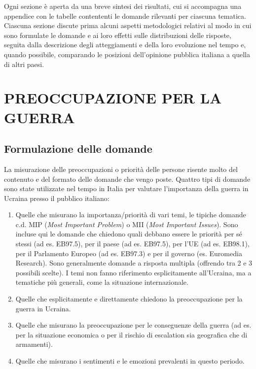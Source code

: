 \documentclass[
  openany]{book}
\begin{document}
Ogni sezione è aperta da una breve sintesi dei risultati, cui si accompagna una appendice con le tabelle contententi le domande rilevanti per ciascuna tematica. Ciascuna sezione discute prima alcuni aspetti metodologici relativi al modo in cui sono formulate le domande e ai loro effetti sulle distribuzioni delle risposte, seguita dalla descrizione degli atteggiamenti e della loro evoluzione nel tempo e, quando possibile, comparando le posizioni dell'opinione pubblica italiana a quella di altri paesi.

\hypertarget{preoccupazione-per-la-guerra}{%
\chapter{PREOCCUPAZIONE PER LA GUERRA}\label{preoccupazione-per-la-guerra}}

\hypertarget{formulazione-delle-domande}{%
\section{Formulazione delle domande}\label{formulazione-delle-domande}}

La misurazione delle preoccupazioni o priorità delle persone risente molto del contenuto e del formato delle domande che vengo poste. Quattro tipi di domande sono state utilizzate nel tempo in Italia per valutare l'importanza della guerra in Ucraina presso il pubblico italiano:

\begin{enumerate}
\def\labelenumi{\alph{enumi})}
\item
  Quelle che misurano la importanza/priorità di vari temi, le tipiche domande c.d. MIP (\emph{Most Important Problem}) o MII (\emph{Most Important Issues}). Sono incluse qui le domande che chiedono quali debbano essere le priorità per sé stessi (ad es. EB97.5), per il paese (ad es. EB97.5), per l'UE (ad es. EB98.1), per il Parlamento Europeo (ad es. EB97.3) e per il governo (es. Euromedia Research). Sono generalmente domande a risposta multipla (offrendo tra 2 e 3 possibili scelte). I temi non fanno riferimento esplicitamente all'Ucraina, ma a tematiche più generali, come la situazione internazionale.
\item
  Quelle che esplicitamente e direttamente chiedono la preoccupazione per la guerra in Ucraina.
\item
  Quelle che misurano la preoccupazione per le conseguenze della guerra (ad es. per la situazione economica o per il rischio di escalation sia geografica che di armamenti).
\item
  Quelle che misurano i sentimenti e le emozioni prevalenti in questo periodo.
\end{enumerate}
\end{document}
